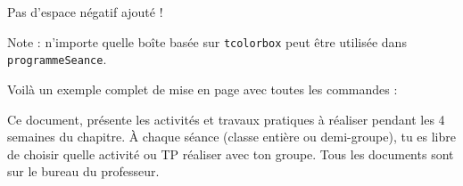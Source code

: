 \begin{boiteCodeTex}{}
  \vspace*{-36 pt}

  Pas d'espace négatif ajouté !
\end{boiteCodeTex}

Note : n'importe quelle boîte basée sur \lstinline|tcolorbox| peut être utilisée dans \lstinline|programmeSeance|.

\newpage
{}

Voilà un exemple complet de mise en page avec toutes les commandes :

\begin{boiteCodeTex}{}

  \begin{importants}
    Ce document,  présente les activités et travaux pratiques à réaliser pendant les 4 semaines du chapitre.
    À chaque séance (classe entière ou demi-groupe), tu es libre de choisir quelle activité ou TP réaliser avec ton groupe.
    Tous les documents sont sur le bureau du professeur.
  \end{importants}


\end{boiteCodeTex}
